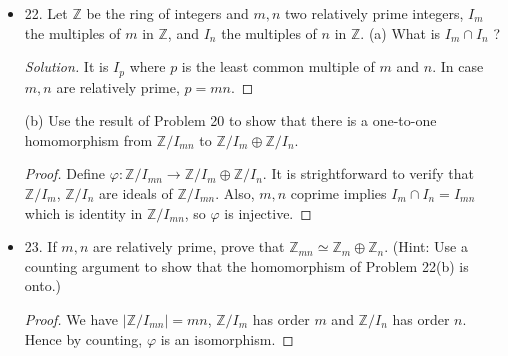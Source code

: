 \begin{itemize}
\begin{proof}
	Moreover, $\varphi$ is surjective, since each element in  $\mathbb{Z}_{15}$ has a remainder when divided by $5$ or devided by $3$. Hence $\varphi$ is a bijection by counting.

	Now we verify $\varphi$ is a homomorphism. Let $m,m' \in \mathbb{Z}_{5}$ and $n, n' \in \mathbb{Z}_3$.
	Then by properties of congruence,
	\begin{align*}
		p_{mn} + p_{m'n'} &\equiv m + m' \pmod 5 \\
		p_{mn} + p_{m'n'} &\equiv n + n' \pmod 3
	.\end{align*}
	Also,
	\begin{align*}
		p_{mn}p_{m'n'} &\equiv m m' \pmod 5 \\
		p_{mn} p_{m'n'} &\equiv n n' \pmod 3
	.\end{align*}
	Hence $\varphi((m+m', n+n')) = p_{mn}+p_{m'n'}$, and $\varphi((mm',n n')) = p_{mn}p_{m'n'}$. Thus a homomorphism. Because it is bijective, it is isomorphism.
\end{proof}

\item 22. Let $\mathbb{Z}$ be the ring of integers and $m, n$ two relatively prime integers, $I_m$ the multiples of $m$ in $\mathbb{Z}$, and $I_n$ the multiples of $n$ in $\mathbb{Z}$.
(a) What is $I_m \cap I_n$ ?
\begin{proof}[Solution]
	It is $I_p$ where $p$ is the least common multiple of $m$ and $n$. In case $m, n$ are relatively prime, $p=mn$.
\end{proof}

(b) Use the result of Problem 20 to show that there is a one-to-one homomorphism from $\mathbb{Z} / I_{m n}$ to $\mathbb{Z} / I_m \oplus \mathbb{Z} / I_n$.
\begin{proof}
	Define $\varphi: \mathbb{Z} / I_{mn} \to  \mathbb{Z} / I_m \oplus \mathbb{Z} / I_n$. It is strightforward to verify that $\mathbb{Z}/I_m$, $\mathbb{Z}/I_n$ are ideals of $\mathbb{Z}/I_{mn}$. Also, $m,n$ coprime implies $I_m \cap I_n = I_{mn}$ which is identity in $\mathbb{Z} / I_{m n}$, so $\varphi$ is injective.
\end{proof}

\item 23. If $m, n$ are relatively prime, prove that $\mathbb{Z}_{m n} \simeq \mathbb{Z}_m \oplus \mathbb{Z}_n$. (Hint: Use a counting argument to show that the homomorphism of Problem 22(b) is onto.)
\begin{proof}
	We have $|\mathbb{Z} / I_{mn}| = mn$, $\mathbb{Z} / I_m$ has order $m$ and $\mathbb{Z} / I_n$ has order $n$. Hence by counting, $\varphi$ is an isomorphism.
\end{proof}


\end{itemize}
